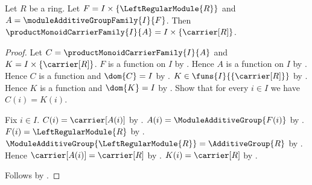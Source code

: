 \begin{proposition}\label{free_module_carrier_family}
    Let $R$ be a ring.
    Let $F=I\times\{\LeftRegularModule{R}\}$ and
        $A=\moduleAdditiveGroupFamily{I}{F}$.
    Then
        $\productMonoidCarrierFamily{I}{A}
            =I\times\{\carrier[R]\}$.
\end{proposition}
\begin{proof}
    Let $C=\productMonoidCarrierFamily{I}{A}$ and
        $K=I\times\{\carrier[R]\}$.
    $F$ is a function on $I$ by
        .
    Hence $A$ is a function on $I$ by
        .
    Hence $C$ is a function and $\dom{C}=I$ by
        .
    $K\in\funs{I}{\{\carrier[R]\}}$ by
        .
    Hence $K$ is a function and $\dom{K}=I$ by
        .
    Show that for every $i\in I$ we have $C(i)=K(i)$.
    \begin{subproof}
        Fix $i\in I$.
        $C(i)=\carrier[A(i)]$ by
            .
        $A(i)=\ModuleAdditiveGroup{F(i)}$ by
            .
        $F(i)=\LeftRegularModule{R}$ by
            .
        $\ModuleAdditiveGroup{\LeftRegularModule{R}}
            =\AdditiveGroup{R}$ by
            .
        Hence $\carrier[A(i)]=\carrier[R]$ by
            .
        $K(i)=\carrier[R]$ by .
    \end{subproof}
    Follows by .
\end{proof}

